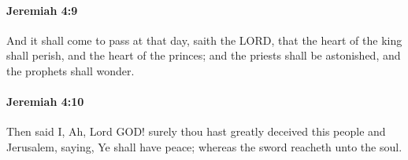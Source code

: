 		\paragraph{Jeremiah 4:9} %
			\label{JEREMIAH-4-9}

			And it shall come to pass at that day, saith the LORD, that the heart of the king shall perish, and the heart of the princes; and the priests shall be astonished, and the prophets shall wonder.


		\paragraph{Jeremiah 4:10} %
			\label{JEREMIAH-4-10}

			Then said I, Ah, Lord GOD! surely thou hast greatly deceived this people and Jerusalem, saying, Ye shall have peace; whereas the sword reacheth unto the soul.


